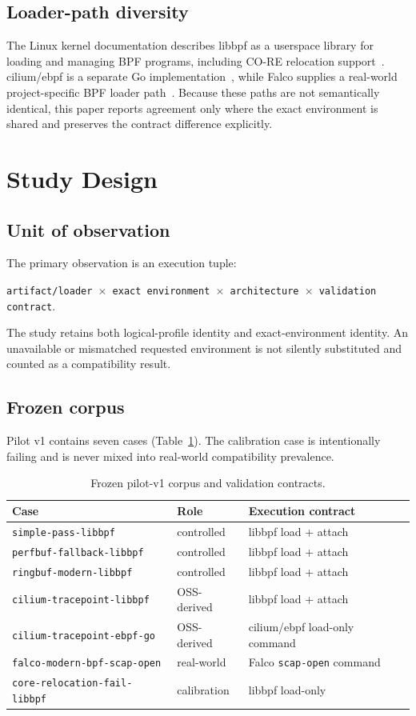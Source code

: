 \documentclass[10pt]{article}
\newcommand{\code}[1]{\texttt{#1}}
\begin{document}
\subsection{Loader-path diversity}
The Linux kernel documentation describes libbpf as a userspace library for loading and managing BPF programs, including CO-RE relocation support~\cite{linux_libbpf_overview}. cilium/ebpf is a separate Go implementation~\cite{cilium_ebpf}, while Falco supplies a real-world project-specific BPF loader path~\cite{falco_libs}. Because these paths are not semantically identical, this paper reports agreement only where the exact environment is shared and preserves the contract difference explicitly.

\section{Study Design}
\subsection{Unit of observation}
The primary observation is an execution tuple:
\begin{center}
\code{artifact/loader $\times$ exact environment $\times$ architecture $\times$ validation contract}.
\end{center}
The study retains both logical-profile identity and exact-environment identity. An unavailable or mismatched requested environment is not silently substituted and counted as a compatibility result.

\subsection{Frozen corpus}
Pilot v1 contains seven cases (Table~\ref{tab:corpus}). The calibration case is intentionally failing and is never mixed into real-world compatibility prevalence.

\begin{table}[h]
\centering
\caption{Frozen pilot-v1 corpus and validation contracts.}
\label{tab:corpus}
\small
\begin{tabularx}{\textwidth}{@{}l l X@{}}
\toprule
Case & Role & Execution contract \\
\midrule
\code{simple-pass-libbpf} & controlled & libbpf load + attach \\
\code{perfbuf-fallback-libbpf} & controlled & libbpf load + attach \\
\code{ringbuf-modern-libbpf} & controlled & libbpf load + attach \\
\code{cilium-tracepoint-libbpf} & OSS-derived & libbpf load + attach \\
\code{cilium-tracepoint-ebpf-go} & OSS-derived & cilium/ebpf load-only command \\
\code{falco-modern-bpf-scap-open} & real-world & Falco \code{scap-open} command \\
\code{core-relocation-fail-libbpf} & calibration & libbpf load-only \\
\bottomrule
\end{tabularx}
\end{table}
\end{document}
